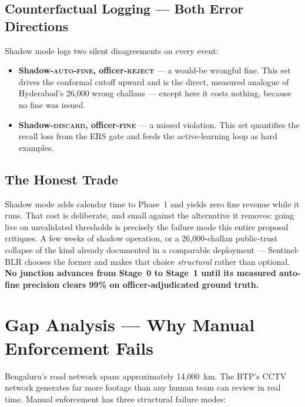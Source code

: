 \documentclass[11pt,a4paper]{article}
\begin{document}
\subsection*{Counterfactual Logging — Both Error Directions}

Shadow mode logs two silent disagreements on every event:

\begin{itemize}[leftmargin=1.8em, itemsep=0.25em]
    \item \textbf{Shadow-\textsc{auto-fine}, officer-\textsc{reject}} --- a would-be wrongful fine. This set drives the conformal cutoff upward and is the direct, measured analogue of Hyderabad's 26,000 wrong challans --- except here it costs nothing, because no fine was issued.
    \item \textbf{Shadow-\textsc{discard}, officer-\textsc{fine}} --- a missed violation. This set quantifies the recall loss from the ERS gate and feeds the active-learning loop as hard examples.
\end{itemize}

\subsection*{The Honest Trade}

\begin{callout}
Shadow mode adds calendar time to Phase~1 and yields zero fine revenue while it runs. That cost is deliberate, and small against the alternative it removes: going live on unvalidated thresholds is precisely the failure mode this entire proposal critiques. A few weeks of shadow operation, or a 26{,}000-challan public-trust collapse of the kind already documented in a comparable deployment --- Sentinel-BLR chooses the former and makes that choice \emph{structural} rather than optional. \textbf{No junction advances from Stage~0 to Stage~1 until its measured auto-fine precision clears 99\% on officer-adjudicated ground truth.}
\end{callout}

\section{Gap Analysis — Why Manual Enforcement Fails}

Bengaluru's road network spans approximately 14,000~km. The BTP's CCTV network generates far more footage than any human team can review in real time. Manual enforcement has three structural failure modes:
\end{document}

